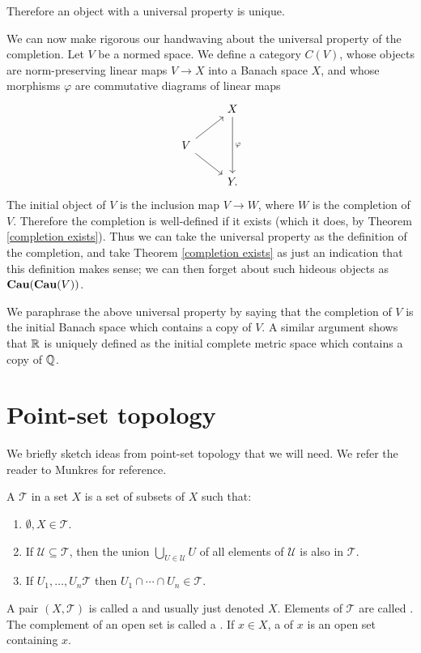 \begin{subsec}
Therefore an object with a universal property is unique.
\end{subsec}

\begin{subsec}
We can now make rigorous our handwaving about the universal property of the completion.
Let $V$ be a normed space. We define a category $C(V)$, whose objects are norm-preserving linear maps $V \to X$ into a Banach space $X$, and whose morphisms $\varphi$ are commutative diagrams of linear maps
$$\begin{tikzcd}&X \arrow[dd,"\varphi"]\\
V \arrow[ur] \arrow[dr]\\
&Y.\end{tikzcd}$$
The initial object of $V$ is the inclusion map $V \to W$, where $W$ is the completion of $V$.
Therefore the completion is well-defined if it exists (which it does, by Theorem \ref{completion exists}).
Thus we can take the universal property as the definition of the completion, and take Theorem \ref{completion exists} as just an indication that this definition makes sense; we can then forget about such hideous objects as $\mathbf{Cau}(\mathbf{Cau}(V))$.
\end{subsec}

\begin{subsec}
We paraphrase the above universal property by saying that the completion of $V$ is the initial Banach space which contains a copy of $V$.
A similar argument shows that $\mathbb{R}$ is uniquely defined as the initial complete metric space which contains a copy of $\mathbb{Q}$.
\end{subsec}

\section{Point-set topology}
We briefly sketch ideas from point-set topology that we will need.
We refer the reader to Munkres \cite{munkres2000topology} for reference.

\begin{definition}
A  $\mathcal T$ in a set $X$ is a set of subsets of $X$ such that:
\begin{enumerate}
\item $\emptyset, X \in \mathcal T$.
\item If $\mathcal U \subseteq \mathcal T$, then the union $\bigcup_{U \in \mathcal U} U$ of all elements of $\mathcal U$ is also in $\mathcal T$.
\item If $U_1, \dots, U_{n} \mathcal T$ then $U_1 \cap \cdots \cap U_{n} \in \mathcal T$.
\end{enumerate}
A pair $(X, \mathcal T)$ is called a  and usually just denoted $X$.
Elements of $\mathcal T$ are called .
The complement of an open set is called a .
If $x \in X$, a  of $x$ is an open set containing $x$.
\end{definition}

